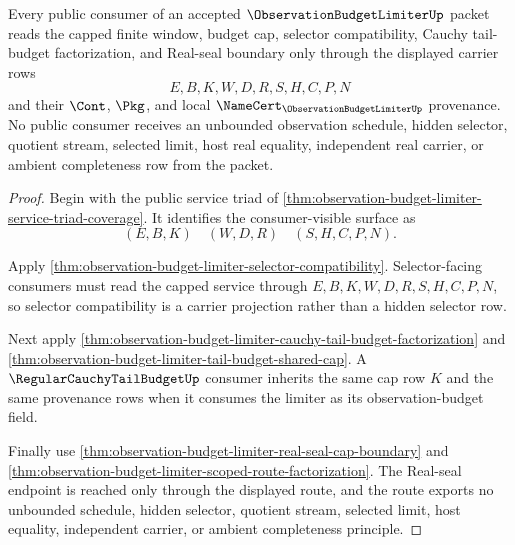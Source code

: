 \begin{theorem}
\label{thm:observation-budget-limiter-public-seal-interface}
Every public consumer of an accepted $\ObservationBudgetLimiterUp$ packet reads the capped finite window, budget cap, selector compatibility, Cauchy tail-budget factorization, and Real-seal boundary only through the displayed carrier rows
$$
E,B,K,W,D,R,S,H,C,P,N
$$
and their $\Cont$, $\Pkg$, and local $\NameCert_{\ObservationBudgetLimiterUp}$ provenance. No public consumer receives an unbounded observation schedule, hidden selector, quotient stream, selected limit, host real equality, independent real carrier, or ambient completeness row from the packet.
\end{theorem}
\begin{proof}
Begin with the public service triad of \autoref{thm:observation-budget-limiter-service-triad-coverage}. It identifies the consumer-visible surface as
$$
(E,B,K) \quad (W,D,R) \quad (S,H,C,P,N).
$$

Apply \autoref{thm:observation-budget-limiter-selector-compatibility}. Selector-facing consumers must read the capped service through $E,B,K,W,D,R,S,H,C,P,N$, so selector compatibility is a carrier projection rather than a hidden selector row.

Next apply \autoref{thm:observation-budget-limiter-cauchy-tail-budget-factorization} and \autoref{thm:observation-budget-limiter-tail-budget-shared-cap}. A $\RegularCauchyTailBudgetUp$ consumer inherits the same cap row $K$ and the same provenance rows when it consumes the limiter as its observation-budget field.

Finally use \autoref{thm:observation-budget-limiter-real-seal-cap-boundary} and \autoref{thm:observation-budget-limiter-scoped-route-factorization}. The Real-seal endpoint is reached only through the displayed route, and the route exports no unbounded schedule, hidden selector, quotient stream, selected limit, host equality, independent carrier, or ambient completeness principle.
\end{proof}

